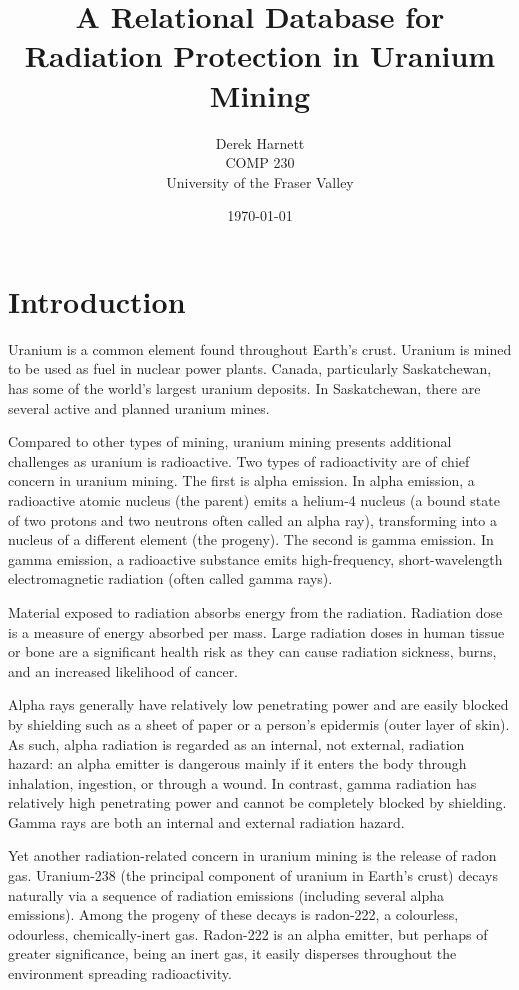 \documentclass[12pt,a4paper]{article}
\title{\textbf{A Relational Database for Radiation Protection in Uranium Mining}}
\author{Derek Harnett \\ COMP 230 \\ University of the Fraser Valley}
\date{\today}
\begin{document}
\maketitle
\thispagestyle{empty}
\newpage


\section{Introduction}

Uranium is a common element found throughout Earth's crust. Uranium is mined to be used as fuel in nuclear power plants. Canada, particularly Saskatchewan, has some of the world's largest uranium deposits. In Saskatchewan, there are several active and planned uranium mines.

Compared to other types of mining, uranium mining presents additional challenges as uranium is radioactive. Two types of radioactivity are of chief concern in uranium mining. The first is alpha emission. In alpha emission, a radioactive atomic nucleus (the parent) emits a helium-4 nucleus (a bound state of two protons and two neutrons often called an alpha ray), transforming into a nucleus of a different element (the progeny). The second is gamma emission. In gamma emission, a radioactive substance emits high-frequency, short-wavelength electromagnetic radiation (often called gamma rays).

Material exposed to radiation absorbs energy from the radiation. Radiation dose is a measure of energy absorbed per mass. Large radiation doses in human tissue or bone are a significant health risk as they can cause radiation sickness, burns, and an increased likelihood of cancer.

Alpha rays generally have relatively low penetrating power and are easily blocked by shielding such as a sheet of paper or a person's epidermis (outer layer of skin). As such, alpha radiation is regarded as an internal, not external, radiation hazard: an alpha emitter is dangerous mainly if it enters the body through inhalation, ingestion, or through a wound. In contrast, gamma radiation has relatively high penetrating power and cannot be completely blocked by shielding. Gamma rays are both an internal and external radiation hazard.

Yet another radiation-related concern in uranium mining is the release of radon gas. Uranium-238 (the principal component of uranium in Earth's crust) decays naturally via a sequence of radiation emissions (including several alpha emissions). Among the progeny of these decays is radon-222, a colourless, odourless, chemically-inert gas. Radon-222 is an alpha emitter, but perhaps of greater significance, being an inert gas, it easily disperses throughout the environment spreading radioactivity.
\end{document}
